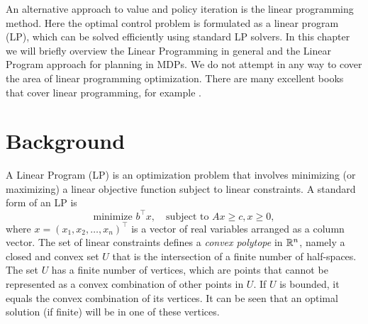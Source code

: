 




An alternative approach to value and policy iteration is the linear programming method. Here the optimal control problem is formulated as a linear program (LP), which can be solved efficiently using standard LP solvers.  
%
In this chapter we will briefly overview the Linear Programming in general and the Linear Program approach for planning in MDPs. We do not attempt in any way to cover the area of linear programming optimization.
There are many excellent books that cover linear programming, for example \cite{Karloff-LP,chvatal1983linear,vanderbei1998linear}. 


\section{Background}

A Linear Program (LP) is an optimization problem that involves
minimizing (or maximizing) a linear objective function subject to
linear constraints. A standard form of an LP is
\begin{equation}\label{eq:LP}
 \textrm{minimize } {b^\top}x,   \quad \textrm{subject to } Ax \ge c,  x \ge 0,
\end{equation}
where $x = {({x_1},{x_2}, \ldots ,{x_n})^\top}$ is a vector of real
variables arranged as a column vector. The set of linear constraints defines a \emph{convex polytope} in $\mathbb{R}^n$, namely a
closed and convex set $U$ that is the intersection of a finite
number of half-spaces. The set $U$ has a finite number of vertices, which are points that cannot be represented as a convex combination of other points in $U$. If $U$ is bounded, it equals the convex combination of its vertices. It can be seen that an optimal solution (if finite) will be in one of these vertices.

